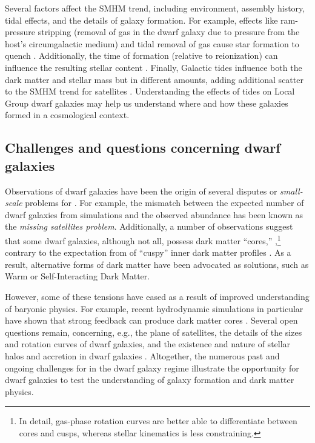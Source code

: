 Several factors affect the SMHM trend, including environment, assembly
history, tidal effects, and the details of galaxy formation. For
example, effects like ram-pressure stripping (removal of gas in the
dwarf galaxy due to pressure from the host's circumgalactic medium) and
tidal removal of gas cause star formation to quench
\citep[e.g.,][]{christensen+2024}. Additionally, the time of formation
(relative to reionization) can influence the resulting stellar content
\citep{kim+2024}. Finally, Galactic tides influence both the dark matter
and stellar mass but in different amounts, adding additional scatter to
the SMHM trend for satellites \citep[e.g.,][]{PNM2008, fattahi+2018}.
Understanding the effects of tides on Local Group dwarf galaxies may
help us understand where and how these galaxies formed in a cosmological
context.

\subsection{Challenges and questions concerning dwarf
galaxies}\label{challenges-and-questions-concerning-dwarf-galaxies}

Observations of dwarf galaxies have been the origin of several disputes
or \emph{small-scale} problems for \LCDM{} \citep[see reviews
by][]{bullock+boylan-kolchin2017, sales+2022}. For example, the mismatch
between the expected number of dwarf galaxies from simulations and the
observed abundance has been known as the \emph{missing satellites
problem}. Additionally, a number of observations suggest that some dwarf
galaxies, although not all, possess dark matter ``cores,''
\citep[e.g.,][]{moore1994, adams+2014, oh+2015, walker+penarrubia2011, read+walker+steger2019},\footnote{In
  detail, gas-phase rotation curves are better able to differentiate
  between cores and cusps, whereas stellar kinematics is less
  constraining.} contrary to the expectation from \LCDM{} of ``cuspy''
inner dark matter profiles \citep{NFW1996, NFW1997}. As a result,
alternative forms of dark matter have been advocated as solutions, such
as Warm or Self-Interacting Dark Matter.

However, some of these tensions have eased as a result of improved
understanding of baryonic physics. For example, recent hydrodynamic
simulations in particular have shown that strong feedback can produce
dark matter cores
\citetext{\citealp[e.g.,][\citet{tollet+2016}]{navarro+eke+frenk1996}; \citealp{fitts+2017}; \citealp{benitez-llambay+2019}; \citealp{orkney+2021}}.
Several open questions remain, concerning, e.g., the plane of
satellites, the details of the sizes and rotation curves of dwarf
galaxies, and the existence and nature of stellar halos and accretion in
dwarf galaxies \citep[e.g.,][]{sales+2022}. Altogether, the numerous
past and ongoing challenges for \LCDM{} in the dwarf galaxy regime
illustrate the opportunity for dwarf galaxies to test the understanding
of galaxy formation and dark matter physics.


